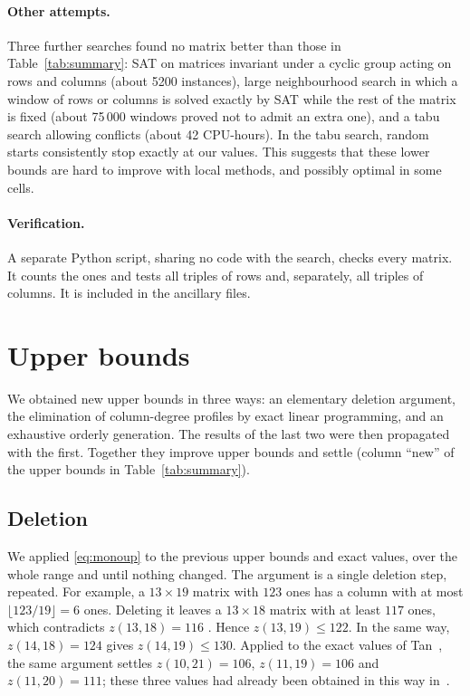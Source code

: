 \documentclass[11pt]{article}
\begin{document}
\paragraph{Other attempts.} Three further searches found no matrix better
than those in Table~\ref{tab:summary}: SAT on matrices invariant under a
cyclic group acting on rows and columns (about 5200 instances), large
neighbourhood search in which a window of rows or columns is solved exactly
by SAT while the rest of the matrix is fixed (about 75\,000 windows proved
not to admit an extra one), and a tabu search allowing conflicts (about 42
CPU-hours). In the tabu search, random starts consistently stop exactly at
our values. This suggests that these lower bounds are hard to improve with
local methods, and possibly optimal in some cells.

\paragraph{Verification.} A separate Python script, sharing no code with
the search, checks every matrix. It counts the ones and tests all triples
of rows and, separately, all triples of columns. It is included in the
ancillary files.

\section{Upper bounds}\label{sec:upper}

We obtained new upper bounds in three ways: an elementary deletion
argument, the elimination of column-degree profiles by exact linear
programming, and an exhaustive orderly generation. The results of the last
two were then propagated with the first. Together they improve
\NumUBImproved{} upper bounds and settle \ClosedList{} (column ``new'' of
the upper bounds in Table~\ref{tab:summary}).

\subsection{Deletion}

We applied \eqref{eq:monoup} to the previous upper bounds and exact values,
over the whole range and until nothing changed. The argument is a single
deletion step, repeated. For example, a
$13\times19$ matrix with $123$ ones has a column with at most
$\lfloor123/19\rfloor=6$ ones. Deleting it leaves a $13\times18$ matrix with
at least $117$ ones, which contradicts $z(13,18)=116$ \cite{CRWR16,Hou26}.
Hence $z(13,19)\le122$. In the same way, $z(14,18)=124$ \cite{CRWR16}
gives $z(14,19)\le130$.
Applied to the exact values of Tan~\cite{Tan22}, the same argument settles
$z(10,21)=106$, $z(11,19)=106$ and $z(11,20)=111$; these three values had
already been obtained in this way in~\cite{Fie26}.
\end{document}
